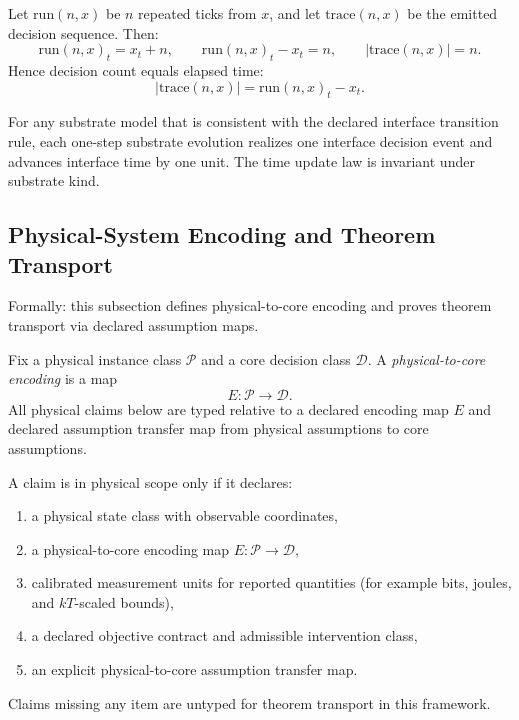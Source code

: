 \begin{proposition}\label{prop:run-time-accounting}
Let $\mathrm{run}(n,x)$ be $n$ repeated ticks from $x$, and let $\mathrm{trace}(n,x)$ be the emitted decision sequence. Then:
\[
\mathrm{run}(n,x)_t = x_t + n,\qquad
\mathrm{run}(n,x)_t - x_t = n,\qquad
|\mathrm{trace}(n,x)|=n.
\]
Hence decision count equals elapsed time:
\[
|\mathrm{trace}(n,x)|=\mathrm{run}(n,x)_t-x_t.
\]
\end{proposition}

\begin{proposition}\label{prop:substrate-unit-time}
For any substrate model that is consistent with the declared interface transition rule, each one-step substrate evolution realizes one interface decision event and advances interface time by one unit. The time update law is invariant under substrate kind.
\end{proposition}

\subsection{Physical-System Encoding and Theorem Transport}\label{sec:physical-transport}

Formally: this subsection defines physical-to-core encoding and proves theorem transport via declared assumption maps.

\begin{definition}\label{def:physical-core-encoding}
Fix a physical instance class $\mathcal{P}$ and a core decision class $\mathcal{D}$. A \emph{physical-to-core encoding} is a map
\[
E:\mathcal{P}\to\mathcal{D}.
\]
All physical claims below are typed relative to a declared encoding map $E$ and declared assumption transfer map from physical assumptions to core assumptions.
\end{definition}

\begin{definition}\label{def:physical-scope-gate}
A claim is in physical scope only if it declares:
\begin{enumerate}
\item a physical state class with observable coordinates,
\item a physical-to-core encoding map \(E:\mathcal{P}\to\mathcal{D}\),
\item calibrated measurement units for reported quantities (for example bits, joules, and \(kT\)-scaled bounds),
\item a declared objective contract and admissible intervention class,
\item an explicit physical-to-core assumption transfer map.
\end{enumerate}
Claims missing any item are untyped for theorem transport in this framework.
\end{definition}

